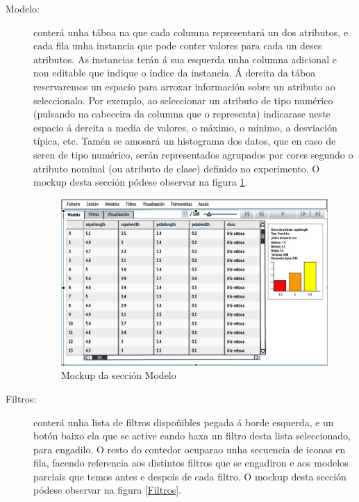 \begin{description}
\item[Modelo:] \hfill
conterá unha táboa na que cada columna representará un dos atributos, e cada fila unha instancia que pode conter valores para cada un deses atributos. As instancias terán á sua esquerda unha columna adicional e non editable que indique o índice da instancia. Á dereita da táboa reservaremos un espacio para arroxar información sobre un atributo ao seleccionalo. Por exemplo, ao seleccionar un atributo de tipo numérico (pulsando na cabeceira da columna que o representa) indicarase neste espacio á dereita a media de valores, o máximo, o mínimo, a desviación típica, etc. Tamén se amosará un histograma dos datos, que en caso de seren de tipo numérico, serán representados agrupados por cores segundo o atributo nominal (ou atributo de clase) definido no experimento. O mockup desta sección pódese observar na figura \ref{Modelo}.
\begin{figure}
\centering
\includegraphics[width=\textwidth,height=\textheight,keepaspectratio]{figuras/Modelo}
\caption{Mockup da sección Modelo}
\label{Modelo}
\end{figure}
\item[Filtros:] \hfill
conterá unha lista de filtros dispoñibles pegada á borde esquerda, e un botón baixo ela que se active cando haxa un filtro desta lista seleccionado, para engadilo. O resto do contedor ocuparao unha secuencia de iconas en fila, facendo referencia aos distintos filtros que se engadiron e aos modelos parciais que temos antes e despois de cada filtro. O mockup desta sección pódese observar na figura \ref{Filtros}.
\begin{figure}
\centering

\end{figure}
\end{description}
